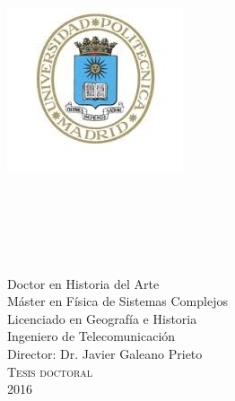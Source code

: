 \documentclass[
11pt, %
spanish, %
onehalfspacing, %
]{MastersDoctoralThesis_custom} %
\author{Francisco Javier \textsc{García Algarra}} %
\begin{document}
\frontmatter %

\pagestyle{plain} %

\begin{titlepage}
\begin{center}
\includegraphics[scale=0.6]{Figures/logoupm.jpg}

\textsc{\Large \univname}\\
\textsc{\large \deptname}\\
\textsc{\large \groupname}\\[4.0cm] %

{\huge \textsc \ttitle}\\[3cm]
{\Large \authorname}\\[0.15cm]
\small Doctor en Historia del Arte\\
\small Máster en Física de Sistemas Complejos\\
\small Licenciado en Geografía e Historia\\
\small Ingeniero de Telecomunicación\\[1.0cm] 
\Large{{Director: }{Dr. Javier Galeano Prieto}}\\[1cm]
\textsc{\Large Tesis doctoral}\\[0.5cm] %
{\large 2016}\\[4cm] %
 
\vfill
\end{center}
\end{titlepage}
\end{document}
